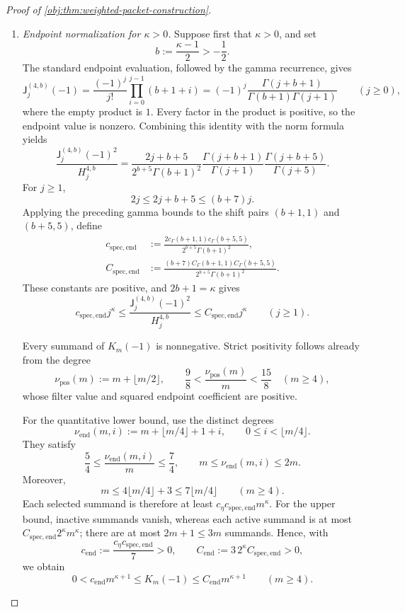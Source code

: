 \documentclass[11pt]{article}
\begin{document}
\begin{proof}[Proof of \cref{obj:thm:weighted-packet-construction}]
\begin{enumerate}
\item \emph{Endpoint normalization for \(\kappa>0\).}
Suppose first that \(\kappa>0\), and set
\[
b:=\frac{\kappa-1}{2}>-\frac12.
\]
The standard endpoint evaluation, followed by the gamma recurrence, gives
\[
\mathsf J_j^{(4,b)}(-1)
=
\frac{(-1)^j}{j!}\prod_{i=0}^{j-1}(b+1+i)
=
(-1)^j\frac{\Gamma(j+b+1)}
{\Gamma(b+1)\Gamma(j+1)}
\qquad(j\ge0),
\]
where the empty product is \(1\). Every factor in the product is positive, so the endpoint value is nonzero. Combining this identity with the norm formula yields
\[
\frac{\mathsf J_j^{(4,b)}(-1)^2}{H_j^{4,b}}
=
\frac{2j+b+5}{2^{b+5}\Gamma(b+1)^2}
\frac{\Gamma(j+b+1)}{\Gamma(j+1)}
\frac{\Gamma(j+b+5)}{\Gamma(j+5)}.
\]
For \(j\ge1\),
\[
2j\le2j+b+5\le(b+7)j.
\]
Applying the preceding gamma bounds to the shift pairs
\((b+1,1)\) and \((b+5,5)\), define
\[
\begin{split}
c_{\mathrm{spec,end}}
&:=
\frac{2c_\Gamma(b+1,1)c_\Gamma(b+5,5)}
     {2^{b+5}\Gamma(b+1)^2},\\
C_{\mathrm{spec,end}}
&:=
\frac{(b+7)C_\Gamma(b+1,1)C_\Gamma(b+5,5)}
     {2^{b+5}\Gamma(b+1)^2}.
\end{split}
\]
These constants are positive, and \(2b+1=\kappa\) gives
\[
c_{\mathrm{spec,end}}j^\kappa
\le
\frac{\mathsf J_j^{(4,b)}(-1)^2}{H_j^{4,b}}
\le
C_{\mathrm{spec,end}}j^\kappa
\qquad(j\ge1).
\]

Every summand of \(K_m(-1)\) is nonnegative. Strict positivity follows already from the degree
\[
\nu_{\mathrm{pos}}(m):=m+\lfloor m/2\rfloor,
\qquad
\frac98<\frac{\nu_{\mathrm{pos}}(m)}m<\frac{15}8
\quad(m\ge4),
\]
whose filter value and squared endpoint coefficient are positive.

For the quantitative lower bound, use the distinct degrees
\[
\nu_{\mathrm{end}}(m,i)
:=
m+\lfloor m/4\rfloor+1+i,
\qquad
0\le i<\lfloor m/4\rfloor.
\]
They satisfy
\[
\frac54\le\frac{\nu_{\mathrm{end}}(m,i)}m\le\frac74,
\qquad
m\le\nu_{\mathrm{end}}(m,i)\le2m.
\]
Moreover,
\[
m\le4\lfloor m/4\rfloor+3
\le7\lfloor m/4\rfloor
\qquad(m\ge4).
\]
Each selected summand is therefore at least
\(c_\eta c_{\mathrm{spec,end}}m^\kappa\). For the upper bound, inactive summands vanish, whereas each active summand is at most
\(C_{\mathrm{spec,end}}2^\kappa m^\kappa\); there are at most \(2m+1\le3m\) summands. Hence, with
\[
c_{\mathrm{end}}
:=\frac{c_\eta c_{\mathrm{spec,end}}}{7}>0,
\qquad
C_{\mathrm{end}}
:=3\,2^\kappa C_{\mathrm{spec,end}}>0,
\]
we obtain
\[
0<c_{\mathrm{end}}m^{\kappa+1}
\le K_m(-1)\le C_{\mathrm{end}}m^{\kappa+1}
\qquad(m\ge4).
\]


\end{enumerate}
\end{proof}
\end{document}

